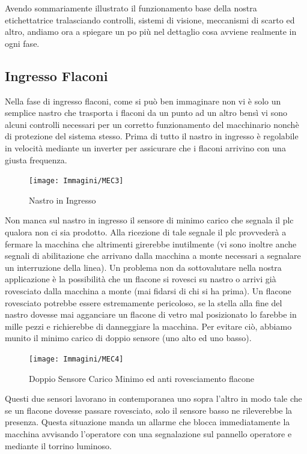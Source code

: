 \documentclass[12pt, a4paper, oneside]{book}
\begin{document}
Avendo sommariamente illustrato il funzionamento base della nostra etichettatrice tralasciando controlli, sistemi di visione, meccanismi di scarto ed altro, andiamo ora a spiegare un po più nel dettaglio cosa avviene realmente in ogni fase.

\subsection{Ingresso Flaconi}
Nella fase di ingresso flaconi, come si può ben immaginare non vi è solo un semplice nastro che trasporta i flaconi da un punto ad un altro bensì vi sono alcuni controlli necessari per un corretto funzionamento del macchinario nonchè di protezione del sistema stesso. Prima di tutto il nastro in ingresso è regolabile in velocità mediante un inverter per assicurare che i flaconi arrivino con una giusta frequenza. 

\begin{figure}[H]
	\centering
	\texttt{[image: Immagini/MEC3]}
	\label{mec3}
	\caption{ Nastro in Ingresso}
\end{figure}

 Non manca sul nastro in ingresso il sensore di minimo carico che segnala il plc qualora non ci sia prodotto. Alla ricezione di tale segnale il plc provvederà a fermare la macchina che altrimenti girerebbe inutilmente (vi sono inoltre anche segnali di abilitazione che arrivano dalla macchina a monte necessari a segnalare un interruzione della linea).
Un problema non da sottovalutare nella nostra applicazione è la possibilità che un flacone si rovesci su nastro o arrivi già rovesciato dalla macchina a monte (mai fidarsi di chi si ha prima). Un flacone rovesciato potrebbe essere estremamente pericoloso, se la stella alla fine del nastro dovesse mai agganciare un flacone di vetro mal posizionato lo farebbe in mille pezzi e richierebbe di danneggiare la macchina. Per evitare ciò, abbiamo munito il minimo carico di doppio sensore (uno alto ed uno basso). 

\begin{figure}[H]
	\centering
	\texttt{[image: Immagini/MEC4]}
	\label{mec4}
	\caption{ Doppio Sensore Carico Minimo ed anti rovesciamento flacone}
\end{figure}

 Questi due sensori lavorano in contemporanea uno sopra l'altro in modo tale che se un flacone dovesse passare rovesciato, solo il sensore basso ne rileverebbe la presenza. Questa situazione manda un allarme che blocca immediatamente la macchina avvisando l'operatore con una segnalazione sul pannello operatore e mediante il torrino luminoso.  
   
\end{document}
